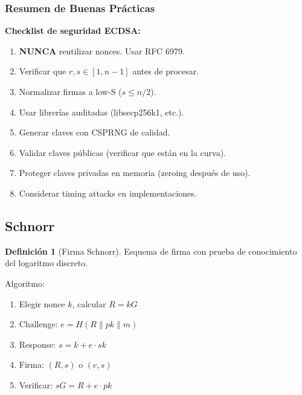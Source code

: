 \documentclass[11pt,a4paper,twoside,openright]{book}
\theoremstyle{definition}
\newtheorem{definition}{Definición}[chapter]
\theoremstyle{plain}
\theoremstyle{remark}
\begin{document}
\subsubsection{Resumen de Buenas Prácticas}

\begin{keyidea}
\textbf{Checklist de seguridad ECDSA:}

\begin{enumerate}
    \item[$\square$] \textbf{NUNCA} reutilizar nonces. Usar RFC 6979.
    \item[$\square$] Verificar que $r, s \in [1, n-1]$ antes de procesar.
    \item[$\square$] Normalizar firmas a low-S ($s \leq n/2$).
    \item[$\square$] Usar librerías auditadas (libsecp256k1, etc.).
    \item[$\square$] Generar claves con CSPRNG de calidad.
    \item[$\square$] Validar claves públicas (verificar que están en la curva).
    \item[$\square$] Proteger claves privadas en memoria (zeroing después de uso).
    \item[$\square$] Considerar timing attacks en implementaciones.
\end{enumerate}
\end{keyidea}


\subsection{Schnorr}

\begin{definition}[Firma Schnorr]
Esquema de firma con prueba de conocimiento del logaritmo discreto.
\end{definition}

Algoritmo:
\begin{enumerate}
    \item Elegir nonce $k$, calcular $R = kG$
    \item Challenge: $e = H(R \| pk \| m)$
    \item Response: $s = k + e \cdot sk$
    \item Firma: $(R, s)$ o $(e, s)$
    \item Verificar: $sG = R + e \cdot pk$
\end{enumerate}
\end{document}

